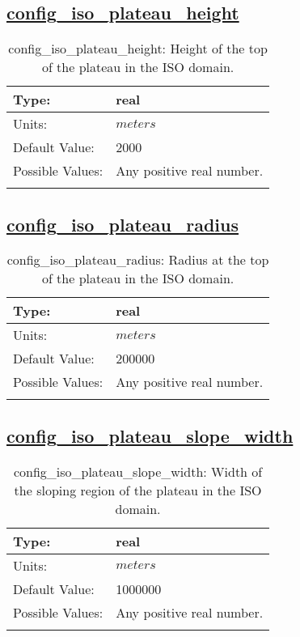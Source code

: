 \subsection[config\_iso\_plateau\_height]{\hyperref[sec:nm_tab_iso]{config\_iso\_plateau\_height}}
\label{subsec:nm_sec_config_iso_plateau_height}
\begin{center}
\begin{longtable}{| p{2.0in} || p{4.0in} |}
    \hline
    Type: & real \\
    \hline
    Units: & $meters$ \\
    \hline
    Default Value: & 2000 \\
    \hline
    Possible Values: & Any positive real number. \\
    \hline
    \caption{config\_iso\_plateau\_height: Height of the top of the plateau in the ISO domain.}
\end{longtable}
\end{center}
\subsection[config\_iso\_plateau\_radius]{\hyperref[sec:nm_tab_iso]{config\_iso\_plateau\_radius}}
\label{subsec:nm_sec_config_iso_plateau_radius}
\begin{center}
\begin{longtable}{| p{2.0in} || p{4.0in} |}
    \hline
    Type: & real \\
    \hline
    Units: & $meters$ \\
    \hline
    Default Value: & 200000 \\
    \hline
    Possible Values: & Any positive real number. \\
    \hline
    \caption{config\_iso\_plateau\_radius: Radius at the top of the plateau in the ISO domain.}
\end{longtable}
\end{center}
\subsection[config\_iso\_plateau\_slope\_width]{\hyperref[sec:nm_tab_iso]{config\_iso\_plateau\_slope\_width}}
\label{subsec:nm_sec_config_iso_plateau_slope_width}
\begin{center}
\begin{longtable}{| p{2.0in} || p{4.0in} |}
    \hline
    Type: & real \\
    \hline
    Units: & $meters$ \\
    \hline
    Default Value: & 1000000 \\
    \hline
    Possible Values: & Any positive real number. \\
    \hline
    \caption{config\_iso\_plateau\_slope\_width: Width of the sloping region of the plateau in the ISO domain.}
\end{longtable}
\end{center}
